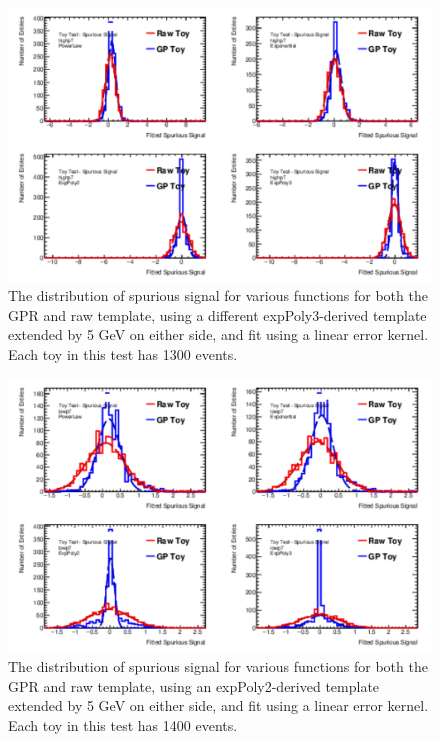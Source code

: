 \begin{figure} 
\begin{center}
  \includegraphics[width=\textwidth]{figures/background/gpr/validation/linear/ToyTest_FitSigVals_highpT_1300_noSig}   
\caption{The distribution of spurious signal for various functions for both the GPR and raw template, using a different expPoly3-derived template extended by 5 GeV on either side, and fit using a linear error kernel. Each toy in this test has 1300 events.}
\label{fig:linearkernel_highpt_1300_noSig}
\end{center}
\end{figure}

\begin{figure} 
\begin{center}
  \includegraphics[width=\textwidth]{figures/background/gpr/validation/linear/ToyTest_FitSigVals_lowpT_1400_noSig}   
\caption{The distribution of spurious signal for various functions for both the GPR and raw template, using an expPoly2-derived template extended by 5 GeV on either side, and fit using a linear error kernel. Each toy in this test has 1400 events.}
\label{fig:linearkernel_lowpt_1400_noSig}
\end{center}
\end{figure}

